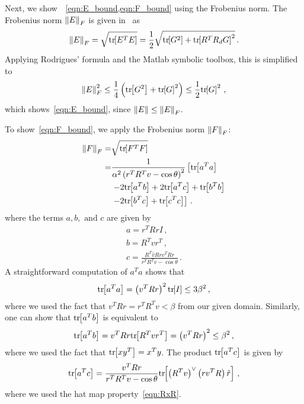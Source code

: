 \documentclass[letterpaper, 10 pt, conference]{ieeeconf}  %
\begin{document}
	Next, we show~~\cref{eqn:E_bound,eqn:F_bound} using the Frobenius norm.
	The Frobenius norm \( \left\| E \right\|_F \) is given in~\cite{lee2011a} as
	\begin{gather*}
		\left\| E \right\|_F = \sqrt{\mathrm{tr}\negthickspace\left[ E^T E \right]} = \frac{1}{2} \sqrt{\mathrm{tr}\negthickspace\left[ G^2 \right] + \mathrm{tr}\negthickspace\left[ R^T R_d G \right]^2} \, .
	\end{gather*}
	Applying Rodrigues' formula and the Matlab symbolic toolbox, this is simplified to
	\begin{gather*}
		\left\| E \right\|^2_F \leq \frac{1}{4} \left( \mathrm{tr}\negthickspace\left[ G^2 \right] + \mathrm{tr}\negthickspace\left[ G \right]^2 \right) \leq \frac{1}{2} \mathrm{tr}\negthickspace\left[ G \right]^2 \, ,
	\end{gather*}
	which shows~\cref{eqn:E_bound}, since \( \left\| E \right\| \leq \left\| E \right\|_F \).
	
	To show~\cref{eqn:F_bound}, we apply the Frobenius norm \( \left\| F \right\|_F \):
	\begin{align*}
		\left\| F \right\|_F =& \sqrt{\mathrm{tr}\negthickspace\left[ F^T F \right]} \\
		=& \frac{1}{\alpha ^2 \left( r^T R^T v - \cos \theta \right)^2} \left[\mathrm{tr}\negthickspace\left[ a^T a \right] \right.\\
		& \left.- 2 \mathrm{tr}\negthickspace\left[ a^T b \right] + 2 \mathrm{tr}\negthickspace\left[ a^T c  \right] + \mathrm{tr}\negthickspace\left[ b^T b \right] \right. \\
		&\left. - 2 \mathrm{tr}\negthickspace\left[ b^T c \right] + \mathrm{tr}\negthickspace\left[ c^T c \right]\right] \, .
	\end{align*}
	where the terms \( a, b, \text{ and } c \) are given by
	\begin{gather*}
		a = r^T R r I \, ,\\
		b = R^T v r^T \, ,\\
		c = \frac{R^T \hat{v} R r v^T R \hat{r}}{r^T R^T v - \cos \theta}\, .
	\end{gather*}
	A straightforward computation of \( a^T a \) shows that
	\begin{gather*}
		\mathrm{tr}\negthickspace\left[ a^T a \right] = \left( v^T R r \right)^2 \mathrm{tr}\negthickspace\left[ I \right] \leq 3 \beta^2 \, ,
	\end{gather*}
	where we used the fact that \( v^T R r = r^T R^T v < \beta \) from our given domain.
	Similarly, one can show that \( \mathrm{tr}\negthickspace\left[ a^T b \right] \) is equivalent to
	\begin{gather*}
		\mathrm{tr}\negthickspace\left[ a^T b \right] = v^T R r \mathrm{tr}\negthickspace\left[ R^T v r^T \right] = \left( v^T R r \right)^2 \leq \beta^2 \, ,
	\end{gather*} 
	where we used the fact that \( \mathrm{tr}\negthickspace\left[ x y^T \right] = x^T y \).
	The product \( \mathrm{tr}\negthickspace\left[ a^T c \right] \) is given by
	\begin{gather*}
		\mathrm{tr}\negthickspace\left[ a^T c \right] = \frac{v^T R r}{r^T R^T v - \cos \theta} \mathrm{tr}\negthickspace\left[ \left( R^T v \right)^\vee \left( r v^T R \right) \hat{r}  \right] \, ,
	\end{gather*}
	where we used the hat map property~\cref{eqn:RxR}.
\end{document}
